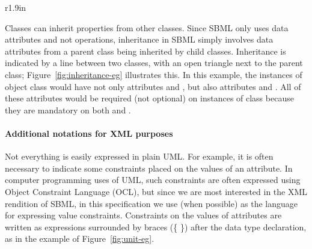 \begin{wrapfigure}[18]{r}{1.9in}
  \centering
  \small
  \vspace*{-7ex}
  \caption{Inheritance.}
  \label{fig:inheritance-eg}
\end{wrapfigure}
Classes can inherit properties from other classes.  Since SBML
only uses data attributes and not operations, inheritance in SBML
simply involves data attributes from a parent class being
inherited by child classes.  Inheritance is indicated by a line
between two classes, with an open triangle next to the parent
class; Figure~\ref{fig:inheritance-eg} illustrates this.  In this
example, the instances of object class  would have
not only attributes  and , but also attributes
 and .  All of these attributes would be
required (not optional) on instances of class 
because they are mandatory on both  and
.



\paragraph{Additional notations for XML purposes}

Not everything is easily expressed in plain UML.  For example, it
is often necessary to indicate some constraints placed on the
values of an attribute.  In computer programming uses of UML, such
constraints are often expressed using Object Constraint Language
(OCL), but since we are most interested in the XML rendition of
SBML, in this specification we use \xmlschemaone (when possible)
as the language for expressing value constraints.  Constraints on
the values of attributes are written as expressions surrounded by
braces (\{ \}) after the data type declaration, as in the example
of Figure~\ref{fig:unit-eg}.

